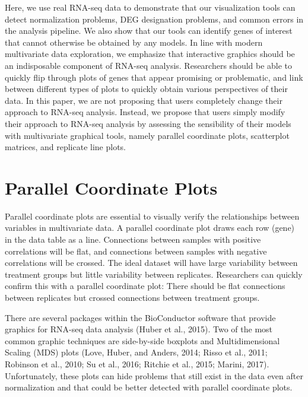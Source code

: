 \documentclass[useAMS,referee]{biom}
\begin{document}
Here, we use real RNA-seq data to demonstrate that our visualization tools can detect normalization problems, DEG designation problems, and common errors in the analysis pipeline. We also show that our tools can identify genes of interest that cannot otherwise be obtained by any models. In line with modern multivariate data exploration, we emphasize that interactive graphics should be an indisposable component of RNA-seq analysis. Researchers should be able to quickly flip through plots of genes that appear promising or problematic, and link between different types of plots to quickly obtain various perspectives of their data. In this paper, we are not proposing that users completely change their approach to RNA-seq analysis. Instead, we propose that users simply modify their approach to RNA-seq analysis by assessing the sensibility of their models with multivariate graphical tools, namely parallel coordinate plots, scatterplot matrices, and replicate line plots.

\section{Parallel Coordinate Plots}
\label{s:Parallel Coordinate Plots}


Parallel coordinate plots are essential to visually verify the relationships between variables in multivariate data. A parallel coordinate plot draws each row (gene) in the data table as a line. Connections between samples with positive correlations will be flat, and connections between samples with negative correlations will be crossed. The ideal dataset will have large variability between treatment groups but little variability between replicates. Researchers can quickly confirm this with a parallel coordinate plot: There should be flat connections between replicates but crossed connections between treatment groups.

There are several packages within the BioConductor software that provide graphics for RNA-seq data analysis (Huber et al., 2015). Two of the most common graphic techniques are side-by-side boxplots and Multidimensional Scaling (MDS) plots (Love, Huber, and Anders, 2014; Risso et al., 2011; Robinson et al., 2010; Su et al., 2016; Ritchie et al., 2015; Marini, 2017). Unfortunately, these plots can hide problems that still exist in the data even after normalization and that could be better detected with parallel coordinate plots.
\end{document}
